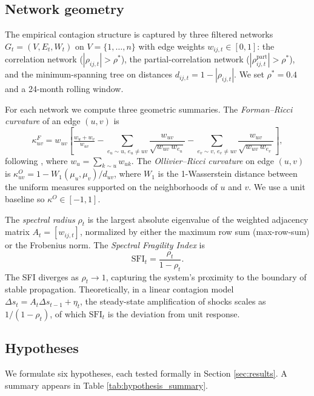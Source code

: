 \documentclass[12pt,a4paper]{article}
\begin{document}
\subsection{Network geometry}
The empirical contagion structure is captured by three filtered networks
$G_t=(V,E_t,W_t)$ on $V=\{1,\dots,n\}$ with edge weights $w_{ij,t}\in[0,1]$:
the correlation network ($|\rho_{ij,t}|>\rho^*$), the partial-correlation
network ($|\rho_{ij,t}^{\mathrm{part}}|>\rho^*$), and the minimum-spanning
tree on distances $d_{ij,t}=1-|\rho_{ij,t}|$. We set $\rho^*=0.4$ and a
24-month rolling window.

For each network we compute three geometric summaries. The
\emph{Forman--Ricci curvature} of an edge $(u,v)$ is
\begin{equation}
\kappa_{uv}^{F} = w_{uv}\!\left[\tfrac{w_u+w_v}{w_{uv}}
- \!\sum_{e_u\sim u,\,e_u\neq uv}\!\frac{w_{uv}}{\sqrt{w_{uv}\,w_{e_u}}}
- \!\sum_{e_v\sim v,\,e_v\neq uv}\!\frac{w_{uv}}{\sqrt{w_{uv}\,w_{e_v}}}\right],
\label{eq:forman}
\end{equation}
following \citet{Forman2003}, where $w_u=\sum_{k\sim u} w_{uk}$. The
\emph{Ollivier--Ricci curvature} \citep{Ollivier2009} on edge $(u,v)$ is
$\kappa_{uv}^{O} = 1 - W_1(\mu_u,\mu_v)/d_{uv}$, where $W_1$ is the
1-Wasserstein distance between the uniform measures supported on the
neighborhoods of $u$ and $v$. We use a unit baseline so $\kappa^O\in[-1,1]$.

The \emph{spectral radius} $\rho_t$ is the largest absolute eigenvalue of the
weighted adjacency matrix $A_t=[w_{ij,t}]$, normalized by either the maximum
row sum (max-row-sum) or the Frobenius norm. The \emph{Spectral Fragility
Index} is
\begin{equation}
\mathrm{SFI}_t = \frac{\rho_t}{1-\rho_t}.
\label{eq:sfi}
\end{equation}
The SFI diverges as $\rho_t\to 1$, capturing the system's proximity to the
boundary of stable propagation. Theoretically, in a linear contagion model
$\Delta s_t = A_t \Delta s_{t-1}+\eta_t$, the steady-state amplification of
shocks scales as $1/(1-\rho_t)$, of which $\mathrm{SFI}_t$ is the
deviation from unit response.

\subsection{Hypotheses}
We formulate six hypotheses, each tested formally in Section
\ref{sec:results}. A summary appears in Table \ref{tab:hypothesis_summary}.
\end{document}

